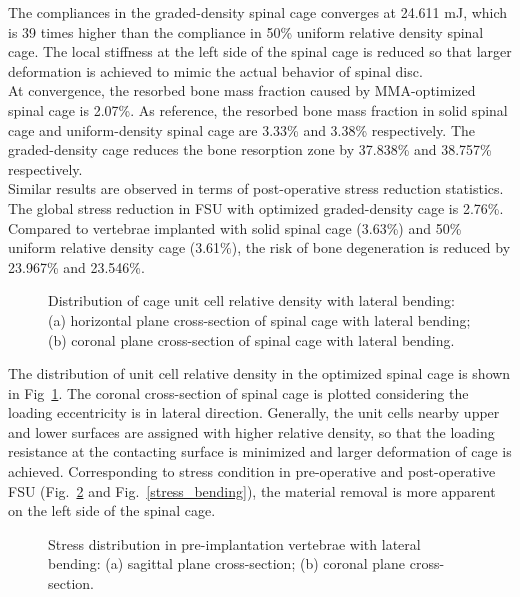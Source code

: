 \documentclass[12pt]{extbook}
\begin{document}
The compliances in the graded-density spinal cage converges at 24.611 mJ, which is 39 times higher than the compliance in 50\% uniform relative density spinal cage. The local stiffness at the left side of the spinal cage is reduced so that larger deformation is achieved to mimic the actual behavior of spinal disc.\\

At convergence, the resorbed bone mass fraction caused by MMA-optimized spinal cage is 2.07\%. As reference, the resorbed bone mass fraction in solid spinal cage and uniform-density spinal cage are 3.33\% and 3.38\% respectively. The graded-density cage reduces the bone resorption zone by 37.838\% and 38.757\% respectively.\\

Similar results are observed in terms of post-operative stress reduction statistics. The global stress reduction in FSU with optimized graded-density cage is 2.76\%. Compared to vertebrae implanted with solid spinal cage (3.63\%) and 50\% uniform relative density cage (3.61\%), the risk of bone degeneration is reduced by 23.967\% and 23.546\%.\\

\begin{figure}[htbp]
\centering
{}
\caption{Distribution of cage unit cell relative density with lateral bending: (a) horizontal plane cross-section of spinal cage with lateral bending; (b) coronal plane cross-section of spinal cage with lateral bending.}
\label{density_bending}
\end{figure}

The distribution of unit cell relative density in the optimized spinal cage is shown in Fig~\ref{density_bending}. The coronal cross-section of spinal cage is plotted considering the loading eccentricity is in lateral direction. Generally, the unit cells nearby upper and lower surfaces are assigned with higher relative density, so that the loading resistance at the contacting surface is minimized and larger deformation of cage is achieved. Corresponding to stress condition in pre-operative and post-operative FSU (Fig.~\ref{ref_bending} and Fig.~\ref{stress_bending}), the material removal is more apparent on the left side of the spinal cage.\\

\begin{figure}[htbp]
\centering
{}
\caption{Stress distribution in pre-implantation vertebrae with lateral bending: (a) sagittal plane cross-section; (b) coronal plane cross-section.}
\label{ref_bending}
\end{figure}
\end{document}
